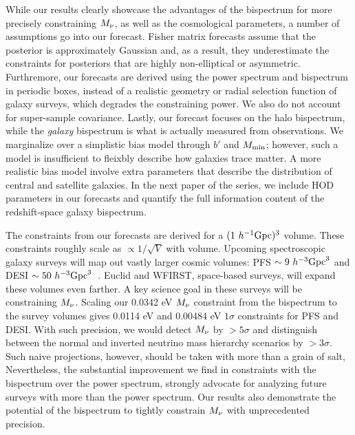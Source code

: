While our results clearly showcase the advantages of the bispectrum for
more precisely constraining $M_\nu$, as well as the cosmological parameters, 
a number of assumptions go into our forecast. Fisher matrix forecasts assume 
that the posterior is approximately Gaussian and, as a result, they 
underestimate the constraints for posteriors that are highly non-elliptical 
or asymmetric. Furthremore, our forecasts are derived using the power spectrum 
and bispectrum in periodic boxes, instead of a realistic geometry or 
radial selection function of galaxy surveys, which degrades the constraining power. 
We also do not account for super-sample covariance. Lastly, our forecast
focuses on the halo bispectrum, while the \emph{galaxy} bispectrum is what is 
actually measured from observations. We marginalize over a simplistic bias model 
through $b'$ and $M_{\rm min}$; however, such a model is insufficient to 
fleixbly describe how galaxies trace matter. A more realistic bias model 
involve extra parameters that describe the distribution of central and satellite 
galaxies. In the next paper of the series, we include HOD parameters in our
forecasts and quantify the full information content of the redshift-space 
galaxy bispectrum. 

The constraints from our forecasts are derived for a $(1~h^{-1}{\rm Gpc})^3$ 
volume. These constraints roughly scale as $\propto1/\sqrt{V}$ with volume. 
Upcoming spectroscopic galaxy surveys will map out vastly larger cosmic
volumes: PFS $\sim 9~h^{-3}{\rm Gpc}^3$ and DESI $\sim 50~h^{-3}{\rm Gpc}^3$~\cite{takada2014, desicollaboration2016}. 
Euclid and WFIRST, space-based surveys, will expand these volumes even 
farther. A key science goal in these surveys will be constraining $M_\nu$. 
Scaling our 0.0342 eV $M_\nu$ constraint from the bispectrum to the survey 
volumes gives 0.0114 eV and 0.00484 eV $1\sigma$ constraints for PFS 
and DESI. With such precision, we would detect $M_\nu$ by $>5\sigma$ and 
distinguish between the normal and inverted neutrino mass hierarchy scenarios 
by $>3\sigma$. Such naive projections, however, should be taken with more than 
a grain of salt, Nevertheless, the substantial improvement we find in 
constraints with the bispectrum over the power spectrum, strongly advocate for 
analyzing future surveys with more than the power spectrum. Our results also 
demonstrate the potential of the bispectrum to tightly constrain $M_\nu$ with 
unprecedented precision.
